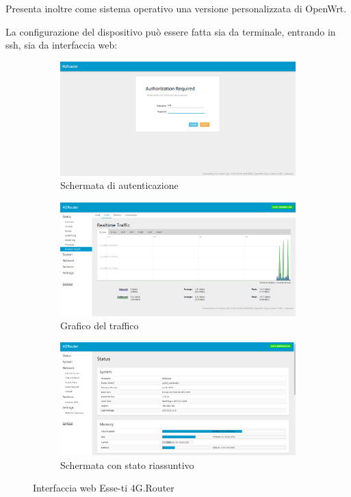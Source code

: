 Presenta inoltre come sistema operativo una versione personalizzata di OpenWrt.

La configurazione del dispositivo può essere fatta sia da terminale, entrando in ssh, sia da interfaccia web:

\begin{figure}[H]

	\newlength{\tempheight}
	\setlength{\tempheight}{23ex}

	\centering%
	\begin{subfigure}[t]{0.5\textwidth}
		\centering%
		\includegraphics[totalheight=\tempheight]{immagini/interfacciar4g_init}
		\caption{Schermata di autenticazione}
	\end{subfigure}%
	\hfill
	\begin{subfigure}[t]{0.5\textwidth}
		\centering%
		\includegraphics[totalheight=\tempheight]{immagini/interfacciar4g_traffic}
		\caption{Grafico del traffico}
	\end{subfigure}

	\medskip

	\begin{subfigure}[b]{\textwidth}
		\centering%
		\includegraphics[totalheight=1.8\tempheight]{immagini/interfacciar4g_status}
		\caption{Schermata con stato riassuntivo}
	\end{subfigure}
	\caption{Interfaccia web Esse-ti 4G.Router}


\end{figure}
